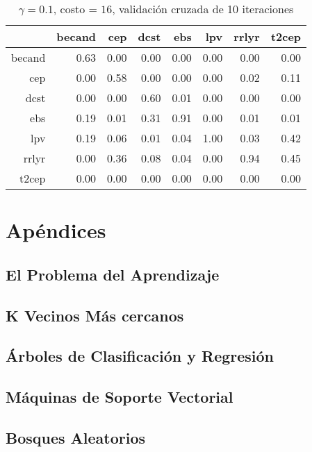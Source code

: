 \documentclass[letterpaper,12pt]{book}
\begin{document}
\begin{table}[ht]
\centering
\begin{tabular}{rrrrrrrr}
  \hline
 & becand & cep & dcst & ebs & lpv & rrlyr & t2cep \\ 
  \hline
becand & 0.63 & 0.00 & 0.00 & 0.00 & 0.00 & 0.00 & 0.00 \\ 
  cep & 0.00 & 0.58 & 0.00 & 0.00 & 0.00 & 0.02 & 0.11 \\ 
  dcst & 0.00 & 0.00 & 0.60 & 0.01 & 0.00 & 0.00 & 0.00 \\ 
  ebs & 0.19 & 0.01 & 0.31 & 0.91 & 0.00 & 0.01 & 0.01 \\ 
  lpv & 0.19 & 0.06 & 0.01 & 0.04 & 1.00 & 0.03 & 0.42 \\ 
  rrlyr & 0.00 & 0.36 & 0.08 & 0.04 & 0.00 & 0.94 & 0.45 \\ 
  t2cep & 0.00 & 0.00 & 0.00 & 0.00 & 0.00 & 0.00 & 0.00 \\ 
   \hline
\end{tabular}
\caption{$\gamma = 0.1$, costo = $16$, validación cruzada de 10 iteraciones} 
\label{table:cmCvSvm}
\end{table}
\chapter{Apéndices}

\section{El Problema del Aprendizaje\label{cap:problemaAprendizaje}}

\section{K Vecinos Más cercanos}

\section{Árboles de Clasificación y Regresión}

\section{Máquinas de Soporte Vectorial}

\section{Bosques Aleatorios}
\end{document}

